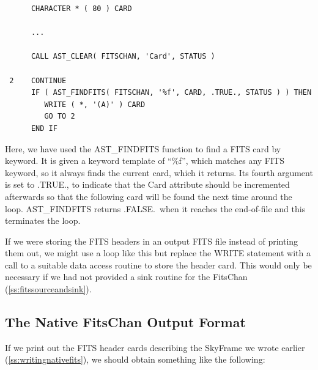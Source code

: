 \documentclass[twoside,11pt]{article}
\newcommand{\htmlref}[2]{#1}
\newcommand{\secref}[1]{\S\ref{#1}}
\renewcommand{\secref}[1]{\ref{#1}}
\begin{document}
\small
\begin{verbatim}
      CHARACTER * ( 80 ) CARD

      ...

      CALL AST_CLEAR( FITSCHAN, 'Card', STATUS )

 2    CONTINUE
      IF ( AST_FINDFITS( FITSCHAN, '%f', CARD, .TRUE., STATUS ) ) THEN
         WRITE ( *, '(A)' ) CARD
         GO TO 2
      END IF
\end{verbatim}
\normalsize

Here, we have used the \htmlref{AST\_FINDFITS}{AST_FINDFITS} function to find a FITS card by
keyword. It is given a keyword template of ``\%f'', which matches any
FITS keyword, so it always finds the current card, which it
returns. Its fourth argument is set to .TRUE., to indicate that the
\htmlref{Card}{Card} attribute should be incremented afterwards so that the following
card will be found the next time around the loop. AST\_FINDFITS
returns .FALSE.\ when it reaches the end-of-file and this terminates
the loop.

If we were storing the FITS headers in an output FITS file instead of
printing them out, we might use a loop like this but replace the WRITE
statement with a call to a suitable data access routine to store the
header card. This would only be necessary if we had not provided a
sink routine for the FitsChan (\secref{ss:fitssourceandsink}).

\subsection{The Native FitsChan Output Format}

If we print out the FITS header cards describing the \htmlref{SkyFrame}{SkyFrame} we wrote
earlier (\secref{ss:writingnativefits}), we should obtain something
like the following:
\end{document}
